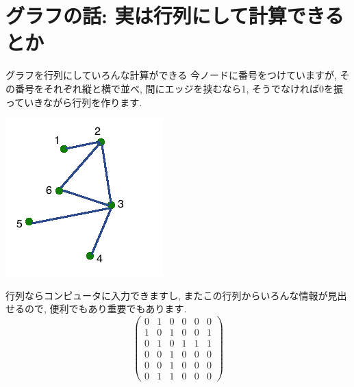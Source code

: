 \documentclass[dvipdfmx,11pt]{beamer}
\theoremstyle{definition}
\begin{document}
\section{グラフの話: 実は行列にして計算できるとか}
\begin{frame}{グラフを行列にしていろんな計算ができる}
今ノードに番号をつけていますが, その番号をそれぞれ縦と横で並べ, 間にエッジを挟むなら1, そうでなければ0を振っていきながら行列を作ります. \\ 

\begin{minipage}[c]{.35\textwidth}
 \begin{center}
  \includegraphics[width=\textwidth]{images/graph_to_matrix.png}
 \end{center}
\end{minipage}
\begin{minipage}[c]{.6\textwidth}
行列ならコンピュータに入力できますし, またこの行列からいろんな情報が見出せるので, 便利でもあり重要でもあります.
$$\begin{pmatrix}
0 & 1 & 0 & 0 & 0 & 0 \\
1 & 0 & 1 & 0 & 0 & 1 \\
0 & 1 & 0 & 1 & 1 & 1 \\
0 & 0 & 1 & 0 & 0 & 0 \\
0 & 0 & 1 & 0 & 0 & 0 \\
0 & 1 & 1 & 0 & 0 & 0 
\end{pmatrix}$$
\end{minipage}
\end{frame}
\end{document}
